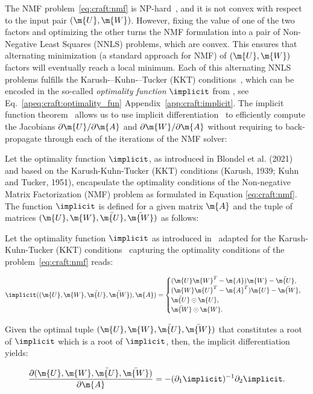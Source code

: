 The NMF problem~\ref{eq:craft:nmf} is NP-hard~\cite{vavasis2010complexity}, and it is not convex with respect to the input pair $(\m{U},\m{W})$. However, fixing the value of one of the two factors and optimizing the other turns the NMF formulation into a pair of Non-Negative Least Squares (NNLS) problems, which are convex. This ensures that alternating minimization (a standard approach for NMF) of $(\m{U},\m{W})$ factors will eventually reach a local minimum.
Each of this alternating NNLS problems fulfills the Karush-–Kuhn-–Tucker (KKT) conditions~\cite{karush1939minima,kuhn1951nonlinear}, which can be encoded in the so-called \textit{optimality function} $\implicit$ from \cite{blondel2021implicitdiff}, see Eq.~\ref{apeq:craft:optimality_fun} Appendix~\ref{app:craft:implicit}. The implicit function theorem~\cite{griewank2008evaluating} allows us to use implicit differentiation~\cite{krantz2002implicit,griewank2008evaluating,bell2008algorithmic} to efficiently compute the Jacobians $\partial \m{U}/ \partial \m{A}$ and $\partial \m{W} / \partial \m{A}$ without requiring to back-propagate through each of the iterations of the NMF solver:

Let the optimality function $\implicit$, as introduced in Blondel et al. (2021) and based on the Karush-Kuhn-Tucker (KKT) conditions (Karush, 1939; Kuhn and Tucker, 1951), encapsulate the optimality conditions of the Non-negative Matrix Factorization (NMF) problem as formulated in Equation \ref{eq:craft:nmf}. The function $\implicit$ is defined for a given matrix $\m{A}$ and the tuple of matrices $(\m{U},\m{W},\bar{\m{U}},\bar{\m{W}})$ as follows:

\begin{theorem} Let the optimality function $\implicit$ as introduced in~\cite{blondel2021implicitdiff} adapted for the Karush-Kuhn-Tucker (KKT) conditions~\cite{karush1939minima,kuhn1951nonlinear} capturing the optimality conditions of the problem~\ref{eq:craft:nmf} reads:

\begin{equation}
    \implicit((\m{U},\m{W},\bar{\m{U}},\bar{\m{W}}),\m{A})=
    \begin{cases}
    (\m{U}\m{W}^T-\m{A})\m{W}-\bar{\m{U}}    ,& \\ 
    (\m{W}\m{U}^T-\m{A}^T)\m{U}-\bar{\m{W}}  ,& \\ 
    \bar{\m{U}} \odot \m{U}   ,& \\ 
    \bar{\m{W}} \odot \m{W}   .& \\
    \end{cases}
\end{equation}

Given the optimal tuple $(\m{U},\m{W},\bar{\m{U}},\bar{\m{W}})$ that constitutes a root of $\implicit$ which is a root of $\implicit$, then, the implicit differentiation yields:

\begin{equation}
\frac{\partial (\m{U},\m{W},\bar{\m{U}},\bar{\m{W}})}{\partial \m{A}}=-(\partial_1 \implicit)^{-1}\partial_2 \implicit.
\end{equation}
\end{theorem}

